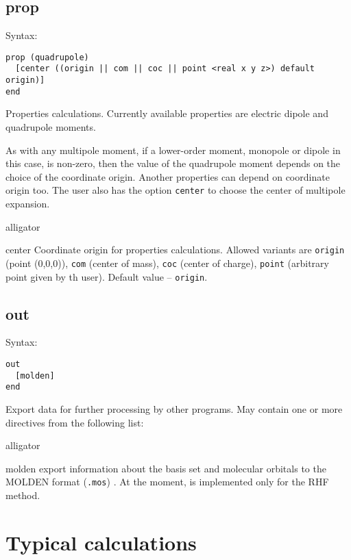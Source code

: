 \documentclass[a4paper, 12pt]{article}
\begin{document}
\subsection{prop}

Syntax:

\begin{lstlisting}
prop (quadrupole)
  [center ((origin || com || coc || point <real x y z>) default origin)]
end
\end{lstlisting}

Properties calculations. Currently available properties are electric dipole and quadrupole moments.

As with any multipole moment, if a lower-order moment, monopole or dipole in this case, is non-zero, then the value of the quadrupole moment depends on the choice of the coordinate origin. Another properties can depend on coordinate origin too. 
The user also has the option \texttt{center} to choose the center of multipole expansion.

\begin{labeling}{alligator}
\item [center] Coordinate origin for properties calculations. Allowed variants are 
\texttt{origin} (point (0,0,0)), \texttt{com} (center of mass), \texttt{coc} (center of charge), \texttt{point} (arbitrary point given by th user). Default value -- \texttt{origin}.
\end{labeling}

\subsection{out}

Syntax:

\begin{lstlisting}
out
  [molden]
end
\end{lstlisting}

Export data for further processing by other programs. May contain one or more directives from the following list:

\begin{labeling}{alligator}
\item [molden] export information about the basis set and molecular orbitals to the MOLDEN format (\texttt{.mos}) \cite{molden2000,molden2017,MoldenFormat}. At the moment, is implemented only for the RHF method.
\end{labeling}

\section{Typical calculations}\label{sec:examples}
\end{document}
